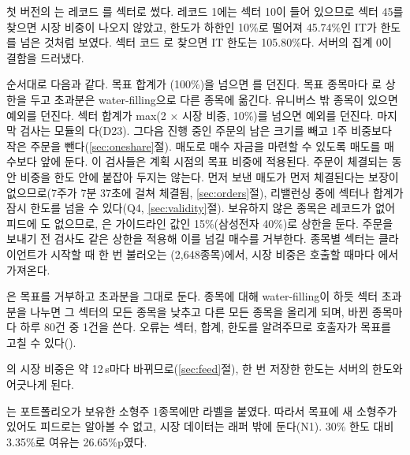  첫 버전의 는 레코드 를 섹터로 썼다. 레코드  1에는 섹터 10이 들어 있으므로 섹터 45를 찾으면 시장 비중이 나오지 않았고, 한도가 하한인 10\%로 떨어져 45.74\%인 IT가 한도를 넘은 것처럼 보였다. 섹터 코드 로 찾으면 IT 한도는 105.80\%다. 서버의 집계 0이 결함을 드러냈다.

 순서대로 다음과 같다. 목표 합계가 (100\%)을 넘으면 를 던진다. 목표 종목마다 로 상한을 두고 초과분은 water-filling으로 다른 종목에 옮긴다. 유니버스 밖 종목이 있으면 예외를 던진다. 섹터 합계가 max(2 $\times$ 시장 비중, 10\%)를 넘으면 예외를 던진다. 마지막 검사는  모듈의 다(D23). 그다음 진행 중인 주문의 남은 크기를 빼고 1주 비중보다 작은 주문을 뺀다(\ref{sec:oneshare}절). 매도로 매수 자금을 마련할 수 있도록 매도를 매수보다 앞에 둔다. 이 검사들은 계획 시점의 목표 비중에 적용된다. 주문이 체결되는 동안 비중을 한도 안에 붙잡아 두지는 않는다. 먼저 보낸 매도가 먼저 체결된다는 보장이 없으므로(7주가 7분 37초에 걸쳐 체결됨, \ref{sec:orders}절), 리밸런싱 중에 섹터나 합계가 잠시 한도를 넘을 수 있다(Q4, \ref{sec:validity}절). 보유하지 않은 종목은  레코드가 없어 피드에 도 없으므로, 은 가이드라인 값인 15\%(삼성전자 40\%)로 상한을 둔다. 주문을 보내기 전 검사도 같은 상한을 적용해 이를 넘길 매수를 거부한다. 종목별 섹터는 클라이언트가 시작할 때 한 번 불러오는 (2,648종목)에서, 시장 비중은 호출할 때마다 에서 가져온다.

 은 목표를 거부하고 초과분을 그대로 둔다. 종목에 대해 water-filling이 하듯 섹터 초과분을 나누면 그 섹터의 모든 종목을 낮추고 다른 모든 종목을 올리게 되며, 바뀐 종목마다 하루 80건 중 1건을 쓴다. 오류는 섹터, 합계, 한도를 알려주므로 호출자가 목표를 고칠 수 있다().



 의 시장 비중은 약 12\,s마다 바뀌므로(\ref{sec:feed}절), 한 번 저장한 한도는 서버의 한도와 어긋나게 된다.

 는 포트폴리오가 보유한 소형주 1종목에만 라벨을 붙였다. 따라서 목표에 새 소형주가 있어도 피드로는 알아볼 수 없고, 시장 데이터는 래퍼 밖에 둔다(N1). 30\% 한도 대비 3.35\%로 여유는 26.65\%p였다.
